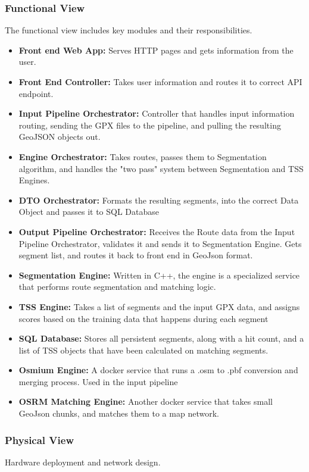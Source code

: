 \documentclass[11pt,twoside]{report}
\begin{document}
\subsubsection{Functional View}
The functional view includes key modules and their responsibilities.
\begin{itemize}
	\item \textbf{Front end Web App:} Serves HTTP pages and gets information from the user.
	\item \textbf{Front End Controller:} Takes user information and routes it to correct API endpoint.
	\item \textbf{Input Pipeline Orchestrator:} Controller that handles input information routing, sending the GPX files to the pipeline, and pulling the resulting GeoJSON objects out.
	\item \textbf{Engine Orchestrator:} Takes routes, passes them to Segmentation algorithm, and handles the "two pass" system between Segmentation and TSS Engines.
	\item \textbf{DTO Orchestrator:} Formats the resulting segments, into the correct Data Object and passes it to SQL Database
	\item \textbf{Output Pipeline Orchestrator:} Receives the Route data from the Input Pipeline Orchestrator, validates it and sends it to Segmentation Engine. Gets segment list, and routes it back to front end in GeoJson format.
	\item \textbf{Segmentation Engine:} Written in C++, the engine is a specialized service that performs route segmentation and matching logic.
	\item \textbf{TSS Engine:} Takes a list of segments and the input GPX data, and assigns scores based on the training data that happens during each segment
	\item \textbf{SQL Database:} Stores all persistent segments, along with a hit count, and a list of TSS objects that have been calculated on matching segments.
	\item \textbf{Osmium Engine:} A docker service that runs a .osm to .pbf conversion and merging process. Used in the input pipeline
	\item \textbf{OSRM \citep{Luxen2011} Matching Engine:} Another docker service that takes small GeoJson chunks, and matches them to a map network.
\end{itemize}

\subsubsection{Physical View}
Hardware deployment and network design.
\end{document}
